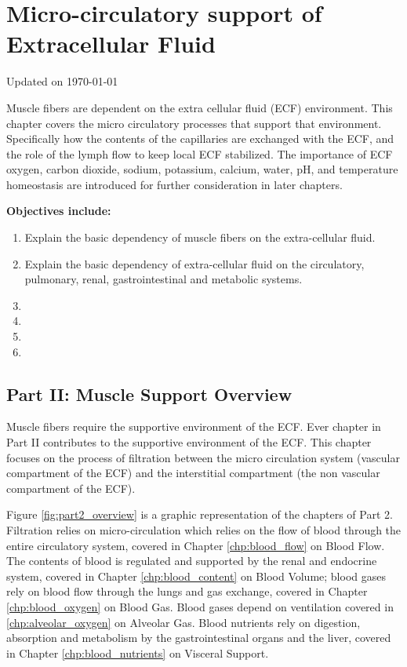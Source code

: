\chapter{Micro-circulatory support of Extracellular Fluid}\label{chp:ecf_microcirculation}
Updated on \today
\minitoc


Muscle fibers are dependent on the extra cellular fluid (ECF) environment. This chapter covers the micro circulatory processes that support that environment. Specifically how the contents of the capillaries are exchanged with the ECF, and the role of the lymph flow to keep local ECF stabilized. The importance of ECF oxygen, carbon dioxide, sodium, potassium, calcium, water, pH, and temperature homeostasis are introduced for further consideration in later chapters.

\vspace{5mm}

\textbf{Objectives include:}
\begin{enumerate}
    \item Explain the basic dependency of muscle fibers on the extra-cellular fluid.
    \item Explain the basic dependency of extra-cellular fluid on the circulatory, pulmonary, renal, gastrointestinal and metabolic systems.
    \item
    \item
    \item
    \item
\end{enumerate}

\section{Part II: Muscle Support Overview}

Muscle fibers require the supportive environment of the ECF. Ever chapter in Part II contributes to the supportive environment of the ECF. This chapter focuses on the process of filtration between the micro circulation system (vascular compartment of the ECF) and the interstitial compartment (the non vascular compartment of the ECF). 

Figure \ref{fig:part2_overview} is a graphic representation of the chapters of Part 2. Filtration relies on micro-circulation which relies on the flow of blood through the entire circulatory system, covered in Chapter \ref{chp:blood_flow} on Blood Flow. The contents of blood is regulated and supported by the renal and endocrine system, covered in Chapter \ref{chp:blood_content} on Blood Volume; blood gases rely on blood flow through the lungs and gas exchange, covered in Chapter \ref{chp:blood_oxygen} on Blood Gas. Blood gases depend on ventilation covered in \ref{chp:alveolar_oxygen} on Alveolar Gas. Blood nutrients rely on digestion, absorption and metabolism by the gastrointestinal organs and the liver, covered in Chapter \ref{chp:blood_nutrients} on Visceral Support.

